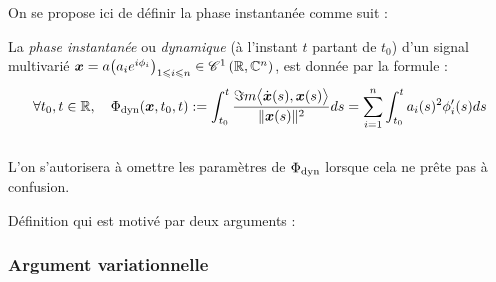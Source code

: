 On se propose ici de définir la phase instantanée comme suit :
\begin{definition} \label{def:phase_d}
	La \emph{phase instantanée} ou \emph{dynamique} (à l'instant $t$ partant de $t_0$) d'un signal multivarié $\x = a\big(a_ie^{i\phi_i}\big)_{1\leq i\leq n} \in \conti[1]{\R}{\C^n}$, est donnée par la formule :
	\begin{equation} \label{eq:phase_d}
		\forall t_0, t\in\R, \quad \phased(\x, t_0,t) \defeq \int_{t_0}^t \frac{\Im m \big\langle \dot{\x}(s) , \x(s) \big\rangle}{\|\x(s)\|^2} ds =\sum_{i=1}^n \int_{t_0}^t a_i(s)^2 \phi_i'(s)ds
	\end{equation}
	\\
	L'on s'autorisera à omettre les paramètres de $\phased$ lorsque cela ne prête pas à confusion.
\end{definition}
\skipl

Définition qui est motivé par deux arguments :



\subsubsection*{Argument variationnelle}

